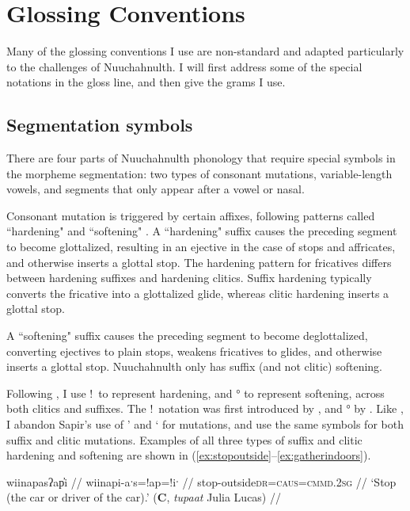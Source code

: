\chapter{Glossing Conventions}

Many of the glossing conventions I use are non-standard and adapted particularly to the challenges of Nuuchahnulth. I will first address some of the special notations in the gloss line, and then give the grams I use.

\section{Segmentation symbols}

There are four parts of Nuuchahnulth phonology that require special symbols in the morpheme segmentation: two types of consonant mutations, variable-length vowels, and segments that only appear after a vowel or nasal.

Consonant mutation is triggered by certain affixes, following patterns called ``hardening" and ``softening" \citep{werle2010}. A ``hardening" suffix causes the preceding segment to become glottalized, resulting in an ejective in the case of stops and affricates, and otherwise inserts a glottal stop. The hardening pattern for fricatives differs between hardening suffixes and hardening clitics. Suffix hardening typically converts the fricative into a glottalized glide, whereas clitic hardening inserts a glottal stop.

A ``softening" suffix causes the preceding segment to become deglottalized, converting ejectives to plain stops, weakens fricatives to glides, and otherwise inserts a glottal stop. Nuuchahnulth only has suffix (and not clitic) softening.

Following \cite{werle2010}, I use !\ to represent hardening, and ° to represent softening, across both clitics and suffixes. The !\ notation was first introduced by \cite{boas1947}, and ° by \cite{jacobsen1996}. Like \citeauthor{werle2010}, I abandon Sapir's use of ' and ` for mutations, and use the same symbols for both suffix and clitic mutations. Examples of all three types of suffix and clitic hardening and softening are shown in (\ref{ex:stopoutside}--\ref{ex:gatherindoors}).

\ex \label{ex:stopoutside}
\begingl
\glpreamble wiinapasʔap̓i //
\gla wiinapi-aˑs=!ap=!iˑ //
\glb stop-outside\textsc{dr}=\textsc{caus}=\textsc{cmmd.2sg} //
\glft `Stop (the car or driver of the car).' (\textbf{C}, \textit{tupaat} Julia Lucas) //
\endgl
\xe

